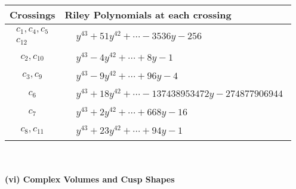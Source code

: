 \documentclass[1p]{elsarticle_modified}
\theoremstyle{definition}
\begin{document}
\begin{tabular}{m{50pt}|m{274pt}}
Crossings & \hspace{64pt}Riley Polynomials at each crossing \\
\hline $$\begin{aligned}c_{1},c_{4},c_{5}\\c_{12}\end{aligned}$$&$\begin{aligned}
&y^{43}+51 y^{42}+\cdots-3536 y-256
\end{aligned}$\\
\hline $$\begin{aligned}c_{2},c_{10}\end{aligned}$$&$\begin{aligned}
&y^{43}-4 y^{42}+\cdots+8 y-1
\end{aligned}$\\
\hline $$\begin{aligned}c_{3},c_{9}\end{aligned}$$&$\begin{aligned}
&y^{43}-9 y^{42}+\cdots+96 y-4
\end{aligned}$\\
\hline $$\begin{aligned}c_{6}\end{aligned}$$&$\begin{aligned}
&y^{43}+18 y^{42}+\cdots-137438953472 y-274877906944
\end{aligned}$\\
\hline $$\begin{aligned}c_{7}\end{aligned}$$&$\begin{aligned}
&y^{43}+2 y^{42}+\cdots+668 y-16
\end{aligned}$\\
\hline $$\begin{aligned}c_{8},c_{11}\end{aligned}$$&$\begin{aligned}
&y^{43}+23 y^{42}+\cdots+94 y-1
\end{aligned}$\\
\hline
\end{tabular}\\~\\
\newpage\flushleft \textbf{(vi) Complex Volumes and Cusp Shapes}
\end{document}
